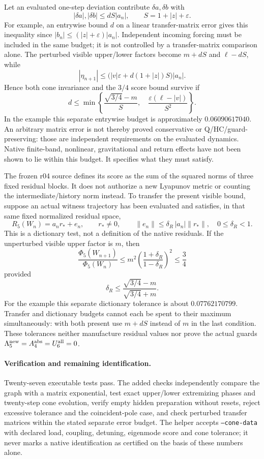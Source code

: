 \documentclass[11pt,a4paper]{article}
\begin{document}
Let an evaluated one-step deviation contribute $\delta a,\delta b$
with
\[
 |\delta a|,|\delta b|\leq d S|a_n|,\qquad
 S=1+|z|+\varepsilon.
\]
For example, an entrywise bound $d$ on a linear transfer-matrix
error gives this inequality since $|b_n|\leq(|z|+\varepsilon)|a_n|$.
Independent incoming forcing must be included in the same budget;
it is not controlled by a transfer-matrix comparison alone.
The perturbed visible upper/lower factors become
$m+dS$ and $\ell-dS$, while
\[
 |\eta_{n+1}|\leq
 \bigl(|v|\varepsilon+d(1+|z|)S\bigr)|a_n|.
\]
Hence both cone invariance and the $3/4$ score bound survive if
\[
 d\leq\min\left\{
  \frac{\sqrt{3/4}-m}{S},\quad
  \frac{\varepsilon(\ell-|v|)}{S^2}
 \right\}.
\]
In the example this separate entrywise budget is approximately
$0.06090617040$. An arbitrary matrix error is not thereby proved
conservative or Q/HC/guard-preserving: those are independent
requirements on the evaluated dynamics. Native finite-band,
nonlinear, gravitational and return effects have not been shown
to lie within this budget. It specifies what they must satisfy.

The frozen r04 source defines its score as the sum of the squared
norms of three fixed residual blocks. It does not authorize a new
Lyapunov metric or counting the intermediate/history norm instead.
To transfer the present visible bound, suppose an actual witness
trajectory has been evaluated and satisfies, in that same fixed
normalized residual space,
\[
 R_5(W_n)=a_n r_*+e_n,\qquad r_*\ne0,\qquad
 \|e_n\|\leq\delta_R\,|a_n|\|r_*\|,\quad 0\leq\delta_R<1.
\]
This is a dictionary test, not a definition of the native residuals.
If the unperturbed visible upper factor is $m$, then
\[
 \frac{\Phi_5(W_{n+1})}{\Phi_5(W_n)}
 \leq m^2\left(\frac{1+\delta_R}{1-\delta_R}\right)^2
 \leq\frac34
\]
provided
\[
 \delta_R\leq
 \frac{\sqrt{3/4}-m}{\sqrt{3/4}+m}.
\]
For the example this separate dictionary tolerance is about
$0.07762170799$. Transfer and dictionary budgets cannot each be
spent to their maximum simultaneously: with both present use
$m+dS$ instead of $m$ in the last condition. These tolerances
neither manufacture residual values nor prove the actual guards
$\Lambda_5^{\rm new}=A_4^{\rm abs}=U_6^{\rm all}=0$.

\paragraph{Verification and remaining identification.}
Twenty-seven executable tests pass. The added checks independently
compare the graph with a matrix exponential, test exact upper/lower
extremizing phases and twenty-step cone evolution, verify empty
hidden preparation without resets, reject excessive tolerance and
the coincident-pole case, and check perturbed transfer matrices
within the stated separate error budget. The helper accepts
\texttt{--cone-data} with declared load, coupling, detuning,
eigenmode score and cone tolerance; it never marks a native
identification as certified on the basis of these numbers alone.
\end{document}
